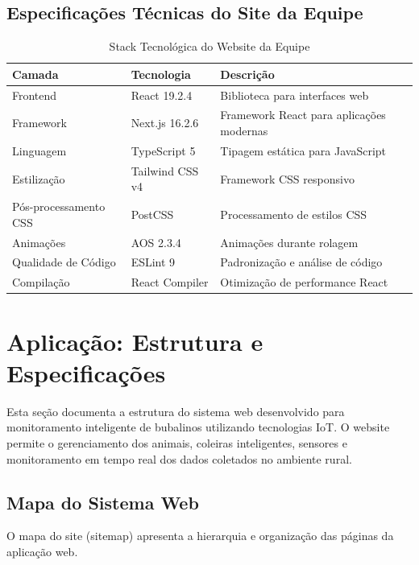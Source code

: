 \documentclass[11pt,a4paper]{article}
\begin{document}
\subsection{Especificações Técnicas do Site da Equipe}

\begin{table}[H]
\centering
\caption{Stack Tecnológica do Website da Equipe}
\label{tab:stack-web}

\begin{tabular}{|l|l|p{5cm}|}
\hline
\textbf{Camada} & \textbf{Tecnologia} & \textbf{Descrição} \\
\hline

Frontend & React 19.2.4 & Biblioteca para interfaces web \\

Framework & Next.js 16.2.6 & Framework React para aplicações modernas \\
Linguagem & TypeScript 5 & Tipagem estática para JavaScript \\
Estilização & Tailwind CSS v4 & Framework CSS responsivo \\
Pós-processamento CSS & PostCSS & Processamento de estilos CSS \\
Animações & AOS 2.3.4 & Animações durante rolagem \\
Qualidade de Código & ESLint 9 & Padronização e análise de código \\
Compilação & React Compiler & Otimização de performance React \\

\hline
\end{tabular}

\end{table}

\section{Aplicação: Estrutura e Especificações}

Esta seção documenta a estrutura do sistema web desenvolvido para monitoramento inteligente de bubalinos utilizando tecnologias IoT. O website permite o gerenciamento dos animais, coleiras inteligentes, sensores e monitoramento em tempo real dos dados coletados no ambiente rural.

\subsection{Mapa do Sistema Web}

O mapa do site (sitemap) apresenta a hierarquia e organização das páginas da aplicação web.
\end{document}
